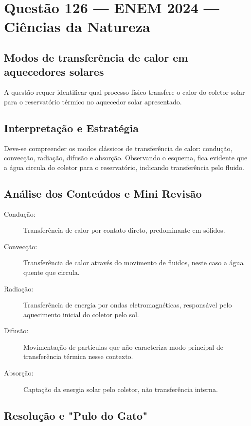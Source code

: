 \documentclass{article}
\begin{document}
\section*{Questão 126 — ENEM 2024 — Ciências da Natureza}

\subsection*{Modos de transferência de calor em aquecedores solares}

A questão requer identificar qual processo físico transfere o calor do coletor solar para o reservatório térmico no aquecedor solar apresentado.

\subsection*{Interpretação e Estratégia}

Deve-se compreender os modos clássicos de transferência de calor: condução, convecção, radiação, difusão e absorção. Observando o esquema, fica evidente que a água circula do coletor para o reservatório, indicando transferência pelo fluido.

\subsection*{Análise dos Conteúdos e Mini Revisão}

\begin{description}
  \item[Condução:] Transferência de calor por contato direto, predominante em sólidos.
  \item[Convecção:] Transferência de calor através do movimento de fluidos, neste caso a água quente que circula.
  \item[Radiação:] Transferência de energia por ondas eletromagnéticas, responsável pelo aquecimento inicial do coletor pelo sol.
  \item[Difusão:] Movimentação de partículas que não caracteriza modo principal de transferência térmica nesse contexto.
  \item[Absorção:] Captação da energia solar pelo coletor, não transferência interna.
\end{description}

\subsection*{Resolução e "Pulo do Gato"}
\end{document}
